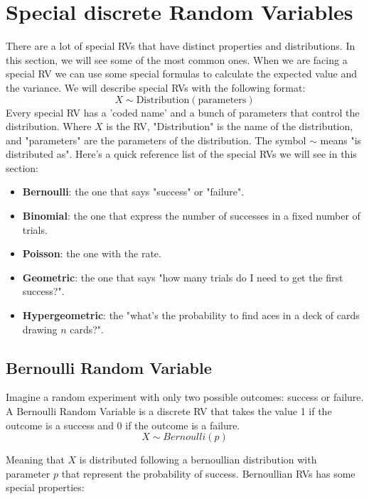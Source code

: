 \documentclass[a4paper]{article}
\newenvironment{focus}{\begin{focusbox}}{\end{focusbox}}
\begin{document}
\section{Special discrete Random Variables}
There are a lot of special RVs that have distinct properties and distributions. In this section, we will see some of the most common ones.
When we are facing a special RV we can use some special formulas to calculate the expected value and the variance.
We will describe special RVs with the following format:
$$ X \sim \text{Distribution}(\text{parameters}) $$
Every special RV has a 'coded name' and a bunch of parameters that control the distribution.
Where $X$ is the RV, "Distribution" is the name of the distribution, and "parameters" are the parameters of the distribution.
The symbol $\sim$ means "is distributed as".
Here's a quick reference list of the special RVs we will see in this section:
\begin{focus}\begin{itemize}
    \item \textbf{Bernoulli}: the one that says "success" or "failure".
    \item \textbf{Binomial}: the one that express the number of successes in a fixed number of trials.
    \item \textbf{Poisson}: the one with the rate.
    \item \textbf{Geometric}: the one that says "how many trials do I need to get the first success?".
    \item \textbf{Hypergeometric}: the "what's the probability to find aces in a deck of cards drawing $n$ cards?".
\end{itemize}
\end{focus}

\subsection{Bernoulli Random Variable}
Imagine a random experiment with only two possible outcomes: success or failure. A Bernoulli Random Variable is a discrete RV that takes the value 1 if the outcome is a success and 0 if the outcome is a failure.
$$X \sim Bernoulli(p)$$

Meaning that $X$ is distributed following a bernoullian distribution with parameter $p$ that represent the probability of success.
Bernoullian RVs has some special properties:
\end{document}
